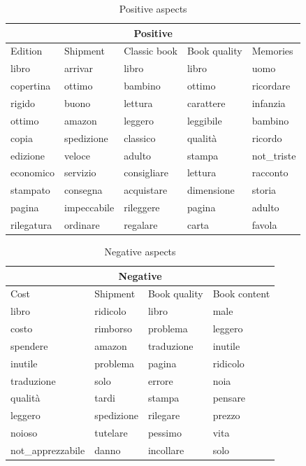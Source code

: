 \documentclass[a4paper,12pt]{article}
\begin{document}
\begin{table}[H]
	\centering
	\begin{tabular}{|l|l|l|l|l|}
		\hline
		\multicolumn{5}{|c|}{\textbf{Positive}}                                                                                                  \\ \hline
		Edition	   & Shipment    & Classic book & Book quality & Memories                               \\ \hline
		libro      & arrivar     & libro       & libro      & uomo                            \\
		copertina  & ottimo      & bambino     & ottimo     & ricordare \\
		rigido     & buono       & lettura     & carattere  & infanzia                        \\
		ottimo     & amazon      & leggero     & leggibile  & bambino                         \\
		copia      & spedizione  & classico    & qualità    & ricordo   \\
		edizione   & veloce      & adulto      & stampa     & not\_triste                    \\
		economico  & servizio    & consigliare & lettura    & racconto  \\
		stampato   & consegna    & acquistare  & dimensione & storia    \\
		pagina     & impeccabile & rileggere   & pagina     & adulto                         \\
		rilegatura & ordinare    & regalare    & carta      & favola   \\
		\hline
	\end{tabular}
	\caption{Positive aspects}
\end{table}


\begin{table}[H]
	\centering
	\begin{tabular}{|l|l|l|l|}
		\hline
		\multicolumn{4}{|c|}{\textbf{Negative}}                               \\ \hline
		Cost              & Shipment   & Book quality & Book content \\ \hline
		libro             & ridicolo   & libro        & male         \\
		costo             & rimborso   & problema     & leggero     \\
		spendere          & amazon     & traduzione   & inutile      \\
		inutile           & problema   & pagina       & ridicolo     \\
		traduzione        & solo       & errore       & noia         \\
		qualità           & tardi      & stampa       & pensare      \\
		leggero           & spedizione & rilegare     & prezzo       \\
		noioso            & tutelare   & pessimo      & vita         \\
		not\_apprezzabile & danno      & incollare    & solo      \\
		\hline  
	\end{tabular}
	\caption{Negative aspects}
\end{table}
\end{document}
